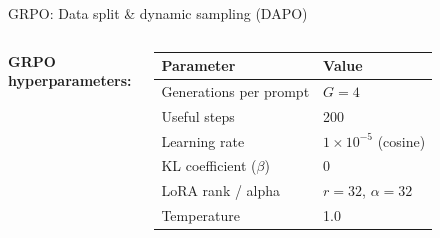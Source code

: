 \documentclass[aspectratio=169,10pt]{beamer}
\begin{document}
\begin{frame}{GRPO: Data split \& dynamic sampling (DAPO)}
\begin{columns}[T]
\vspace{0.3em}
\textbf{GRPO hyperparameters:}
\vspace{0.2em}

\centering
\begin{tabular}{@{}ll@{}}
  \toprule
  \textbf{Parameter} & \textbf{Value} \\
  \midrule
  Generations per prompt & $G = 4$ \\
  Useful steps & 200 \\
  Learning rate & $1\!\times\!10^{-5}$ (cosine) \\
  KL coefficient ($\beta$) & 0 \\
  LoRA rank / alpha & $r\!=\!32$, $\alpha\!=\!32$ \\
  Temperature & 1.0 \\
  \bottomrule
\end{tabular}
\end{columns}
\end{frame}
\end{document}
